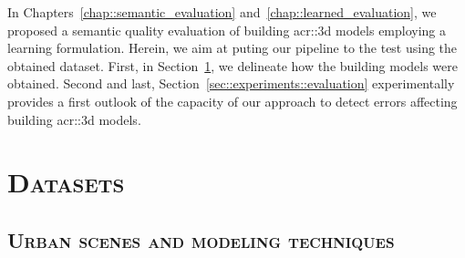 \minitoc

\vfill

In Chapters~\ref{chap::semantic_evaluation} and~\ref{chap::learned_evaluation}, we proposed a semantic quality evaluation of building \gls{acr::3d} models employing a learning formulation.
Herein, we aim at puting our pipeline to the test using the obtained dataset.
First, in Section~\ref{sec::experiments::datasets}, we delineate how the building models were obtained.
Second and last, Section~\ref{sec::experiments::evaluation} experimentally provides a first outlook of the capacity of our approach to detect errors affecting building \gls{acr::3d} models.

\clearpage

\section{\textsc{Datasets}}
    \label{sec::experiments::datasets}
    

    \subsection{\textsc{Urban scenes and modeling techniques}}
        \label{subsec::experiments::datasets::scenes}
        \begin{figure}[htpb]
        \end{figure}

